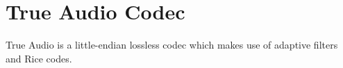
\chapter{True Audio Codec}
True Audio is a little-endian lossless codec
which makes use of adaptive filters and Rice codes.



\clearpage



\clearpage


